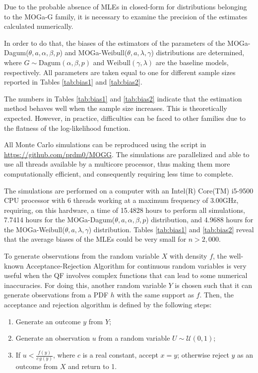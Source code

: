 \documentclass[twoside,leqno,11pt]{article}
\begin{document}
{\color{red}Due to the probable absence of MLEs in closed-form for distributions belonging to the MOGa-G family, it is necessary to examine the precision of the estimates calculated numerically. 

In order to do that, the biases of the estimators of the 
parameters of the MOGa-Dagum($\theta,a,\alpha,\beta,p$) and  MOGa-Weibull($\theta,a,\lambda,\gamma$) distributions 
are determined, where $G\sim \mathrm {Dagum} (\alpha,\beta,p)$ and $\mathrm {Weibull} (\gamma,\lambda)$ are the baseline models, respectively. All parameters are taken equal to 
one for different sample sizes reported in Tables \ref{tab:bias1} and \ref{tab:bias2}. 

The numbers in Tables \ref{tab:bias1} and \ref{tab:bias2} 
indicate that the estimation method behaves well when the 
sample size increases. This is theoretically expected. However, 
in practice, difficulties can be faced to other families due 
to the flatness of the log-likelihood function.

All Monte Carlo simulations can be reproduced using the script 
in \url{https://github.com/prdm0/MOGG}. The simulations are parallelized and able to use all threads available by a multicore processor, thus making them more computa\-tio\-nally efficient, 
and consequently requiring less time to complete. 

The simulations are performed on a computer with an Intel(R) Core(TM) i5-9500 CPU processor with 6 threads working at a maximum frequency of 3.00GHz, requiring, on this hardware, a time of 15.4828 hours to perform all simulations, 7.7414 hours for the MOGa-Dagum($\theta, a, \alpha, \beta, p$) distribution, 
and 4.9688 hours for the MOGa-Weibull($\theta, a, \lambda, \gamma$) distribution. Tables \ref{tab:bias1} and  \ref{tab:bias2} 
reveal that the average biases of the MLEs could be very small for $n>2,000$.}

To generate observations from the random variable $X$ with density $f$, the well-known Acceptance-Rejection Algorithm for 
continuous random variables is very useful when the QF involves complex functions that can lead to some numerical inaccuracies. For doing this, another random variable $Y$ is chosen such that it can generate observations from a PDF $h$ with the same support as $f$. Then, the acceptance and rejection algorithm is defined by the following steps:
\begin{enumerate}
	\item Generate an outcome $y$ from $Y$;
	\item Generate an observation $u$ from a random variable $U\sim \mathcal{U}(0,1)$;
	\item If $u < \frac{f(y)}{c\, g(y)}$, where $c$ is a real constant, accept $x=y$; otherwise reject $y$ as an outcome from $X$ and return to 1.
\end{enumerate}
\end{document}
